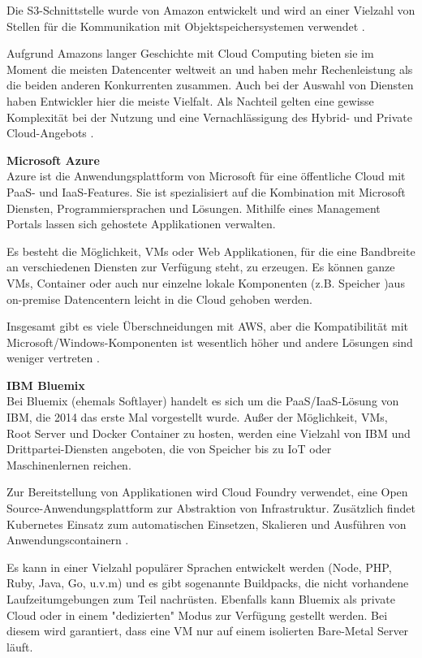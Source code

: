 Die \ac{S3}-Schnittstelle wurde von Amazon entwickelt und wird an einer Vielzahl von Stellen für die Kommunikation mit Objektspeichersystemen verwendet \parencite{aws.2017}.

Aufgrund Amazons langer Geschichte mit Cloud Computing bieten sie im Moment die meisten Datencenter weltweit an und haben mehr Rechenleistung als die beiden anderen Konkurrenten zusammen. Auch bei der Auswahl von Diensten haben Entwickler hier die meiste Vielfalt. Als Nachteil gelten eine gewisse Komplexität bei der Nutzung und eine Vernachlässigung des Hybrid- und Private Cloud-Angebots \parencite{computerworlduk.2016}.


\textbf{Microsoft Azure}\\
Azure ist die Anwendungsplattform von Microsoft für eine öffentliche Cloud mit \acs{PaaS}- und \acs{IaaS}-Features. Sie ist spezialisiert auf die Kombination mit Microsoft Diensten, Programmiersprachen und Lösungen. Mithilfe eines Management Portals lassen sich gehostete Applikationen verwalten. 

Es besteht die Möglichkeit, \acs{VM}s oder Web Applikationen, für die eine Bandbreite an verschiedenen Diensten zur Verfügung steht, zu erzeugen. Es können ganze \acs{VM}s, Container oder auch nur einzelne lokale Komponenten (z.B. Speicher )aus on-premise Datencentern leicht in die Cloud gehoben werden.

Insgesamt gibt es viele Überschneidungen mit \acs{AWS}, aber die Kompatibilität mit Microsoft/Windows-Komponenten ist wesentlich höher und andere Lösungen sind weniger vertreten \parencite{microsoft.2015}.


\textbf{IBM Bluemix}\\
Bei Bluemix (ehemals Softlayer) handelt es sich um die \acs{PaaS}/\acs{IaaS}-Lösung von IBM, die 2014 das erste Mal vorgestellt wurde. Außer der Möglichkeit, \acs{VM}s, Root Server und Docker Container zu hosten, werden eine Vielzahl von IBM und Drittpartei-Diensten angeboten, die von Speicher bis zu \ac{IoT} oder Maschinenlernen reichen.	

Zur Bereitstellung von Applikationen wird Cloud Foundry verwendet, eine Open Source-Anwendungsplattform zur Abstraktion von Infrastruktur. Zusätzlich findet Kubernetes Einsatz zum automatischen Einsetzen, Skalieren und Ausführen von Anwendungscontainern \parencite{bluemix.2017}.

Es kann in einer Vielzahl populärer Sprachen entwickelt werden (Node, PHP, Ruby, Java, Go, u.v.m) und es gibt sogenannte Buildpacks, die nicht vorhandene Laufzeitumgebungen zum Teil nachrüsten. Ebenfalls kann Bluemix als private Cloud oder in einem "dedizierten" Modus zur Verfügung gestellt werden. Bei diesem wird garantiert, dass eine \acs{VM} nur auf einem isolierten Bare-Metal Server läuft.

